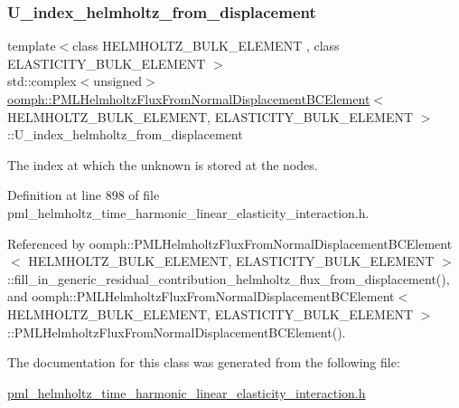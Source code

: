 \mbox{\label{classoomph_1_1PMLHelmholtzFluxFromNormalDisplacementBCElement_aa80b2b79bd3c63f8d7c7f91d97fd22fc}} 
\subsubsection{\texorpdfstring{U\+\_\+index\+\_\+helmholtz\+\_\+from\+\_\+displacement}{U\_index\_helmholtz\_from\_displacement}}
{\footnotesize\ttfamily template$<$class H\+E\+L\+M\+H\+O\+L\+T\+Z\+\_\+\+B\+U\+L\+K\+\_\+\+E\+L\+E\+M\+E\+NT , class E\+L\+A\+S\+T\+I\+C\+I\+T\+Y\+\_\+\+B\+U\+L\+K\+\_\+\+E\+L\+E\+M\+E\+NT $>$ \\
std\+::complex$<$unsigned$>$ \hyperlink{classoomph_1_1PMLHelmholtzFluxFromNormalDisplacementBCElement}{oomph\+::\+P\+M\+L\+Helmholtz\+Flux\+From\+Normal\+Displacement\+B\+C\+Element}$<$ H\+E\+L\+M\+H\+O\+L\+T\+Z\+\_\+\+B\+U\+L\+K\+\_\+\+E\+L\+E\+M\+E\+NT, E\+L\+A\+S\+T\+I\+C\+I\+T\+Y\+\_\+\+B\+U\+L\+K\+\_\+\+E\+L\+E\+M\+E\+NT $>$\+::U\+\_\+index\+\_\+helmholtz\+\_\+from\+\_\+displacement\hspace{0.3cm}{\ttfamily [private]}}



The index at which the unknown is stored at the nodes. 



Definition at line 898 of file pml\+\_\+helmholtz\+\_\+time\+\_\+harmonic\+\_\+linear\+\_\+elasticity\+\_\+interaction.\+h.



Referenced by oomph\+::\+P\+M\+L\+Helmholtz\+Flux\+From\+Normal\+Displacement\+B\+C\+Element$<$ H\+E\+L\+M\+H\+O\+L\+T\+Z\+\_\+\+B\+U\+L\+K\+\_\+\+E\+L\+E\+M\+E\+N\+T, E\+L\+A\+S\+T\+I\+C\+I\+T\+Y\+\_\+\+B\+U\+L\+K\+\_\+\+E\+L\+E\+M\+E\+N\+T $>$\+::fill\+\_\+in\+\_\+generic\+\_\+residual\+\_\+contribution\+\_\+helmholtz\+\_\+flux\+\_\+from\+\_\+displacement(), and oomph\+::\+P\+M\+L\+Helmholtz\+Flux\+From\+Normal\+Displacement\+B\+C\+Element$<$ H\+E\+L\+M\+H\+O\+L\+T\+Z\+\_\+\+B\+U\+L\+K\+\_\+\+E\+L\+E\+M\+E\+N\+T, E\+L\+A\+S\+T\+I\+C\+I\+T\+Y\+\_\+\+B\+U\+L\+K\+\_\+\+E\+L\+E\+M\+E\+N\+T $>$\+::\+P\+M\+L\+Helmholtz\+Flux\+From\+Normal\+Displacement\+B\+C\+Element().



The documentation for this class was generated from the following file\+:\begin{DoxyCompactItemize}
\item 
\hyperlink{pml__helmholtz__time__harmonic__linear__elasticity__interaction_8h}{pml\+\_\+helmholtz\+\_\+time\+\_\+harmonic\+\_\+linear\+\_\+elasticity\+\_\+interaction.\+h}\end{DoxyCompactItemize}
